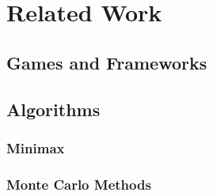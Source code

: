 \chapter{Related Work}

\section{Games and Frameworks}

\section{Algorithms}

\subsection{Minimax}

\subsection{Monte Carlo Methods}

